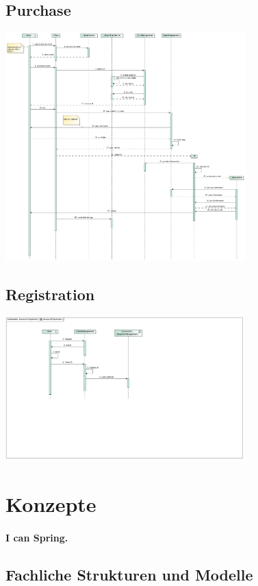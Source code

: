 \documentclass[a4paper]{article}
\begin{document}
\subsection{Purchase}

\includegraphics[width=350px]{sd-purchase.jpg}

\subsection{Registration}

\includegraphics[width=350px]{sd-registration.jpg}

\section{Konzepte}

\paragraph{I can Spring.}

\subsection{Fachliche Strukturen und Modelle}
\end{document}
